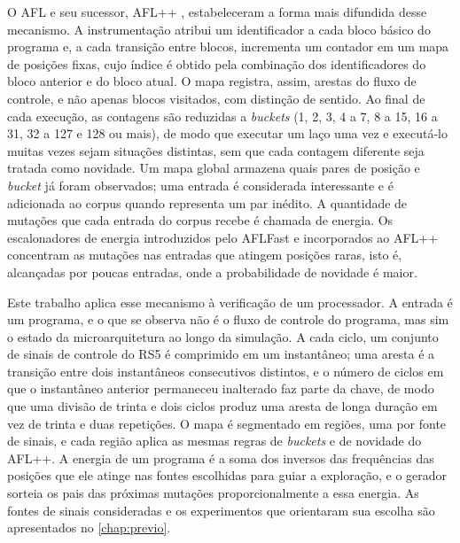O AFL \citep{Zalewski:2013:AFL} e seu sucessor, AFL++ \citep{Fioraldi:2020:AFLpp}, estabeleceram a forma mais difundida desse mecanismo. A instrumentação atribui um identificador a cada bloco básico do programa e, a cada transição entre blocos, incrementa um contador em um mapa de posições fixas, cujo índice é obtido pela combinação dos identificadores do bloco anterior e do bloco atual. O mapa registra, assim, arestas do fluxo de controle, e não apenas blocos visitados, com distinção de sentido. Ao final de cada execução, as contagens são reduzidas a \textit{buckets} (1, 2, 3, 4 a 7, 8 a 15, 16 a 31, 32 a 127 e 128 ou mais), de modo que executar um laço uma vez e executá-lo muitas vezes sejam situações distintas, sem que cada contagem diferente seja tratada como novidade. Um mapa global armazena quais pares de posição e \textit{bucket} já foram observados; uma entrada é considerada interessante e é adicionada ao corpus quando representa um par inédito. A quantidade de mutações que cada entrada do corpus recebe é chamada de energia. Os escalonadores de energia introduzidos pelo AFLFast \citep{Bohme:2016:AFLFast} e incorporados ao AFL++ concentram as mutações nas entradas que atingem posições raras, isto é, alcançadas por poucas entradas, onde a probabilidade de novidade é maior.

Este trabalho aplica esse mecanismo à verificação de um processador. A entrada é um programa, e o que se observa não é o fluxo de controle do programa, mas sim o estado da microarquitetura ao longo da simulação. A cada ciclo, um conjunto de sinais de controle do RS5 é comprimido em um instantâneo; uma aresta é a transição entre dois instantâneos consecutivos distintos, e o número de ciclos em que o instantâneo anterior permaneceu inalterado faz parte da chave, de modo que uma divisão de trinta e dois ciclos produz uma aresta de longa duração em vez de trinta e duas repetições. O mapa é segmentado em regiões, uma por fonte de sinais, e cada região aplica as mesmas regras de \textit{buckets} e de novidade do AFL++. A energia de um programa é a soma dos inversos das frequências das posições que ele atinge nas fontes escolhidas para guiar a exploração, e o gerador sorteia os pais das próximas mutações proporcionalmente a essa energia. As fontes de sinais consideradas e os experimentos que orientaram sua escolha são apresentados no \cref{chap:previo}.


